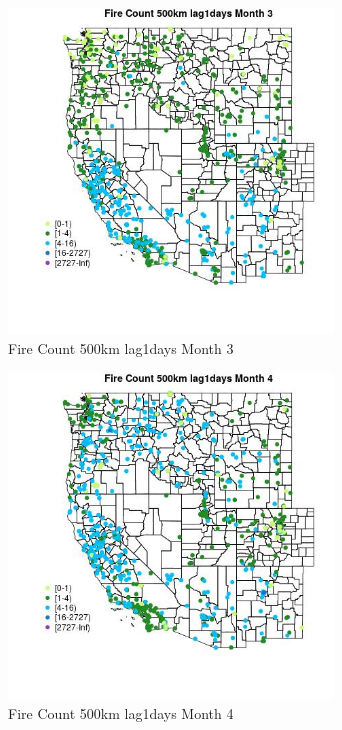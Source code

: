 \begin{figure} 
\centering  
\includegraphics[width=0.77\textwidth]{Code_Outputs/Report_ML_input_PM25_Step4_part_f_de_duplicated_aveswNAs_MapObsMo3Fire_Count_500km_lag1days.jpg} 
\caption{\label{fig:Report_ML_input_PM25_Step4_part_f_de_duplicated_aveswNAsMapObsMo3Fire_Count_500km_lag1days}Fire Count 500km lag1days Month 3} 
\end{figure} 
 

\clearpage 

\begin{figure} 
\centering  
\includegraphics[width=0.77\textwidth]{Code_Outputs/Report_ML_input_PM25_Step4_part_f_de_duplicated_aveswNAs_MapObsMo4Fire_Count_500km_lag1days.jpg} 
\caption{\label{fig:Report_ML_input_PM25_Step4_part_f_de_duplicated_aveswNAsMapObsMo4Fire_Count_500km_lag1days}Fire Count 500km lag1days Month 4} 
\end{figure} 
 

